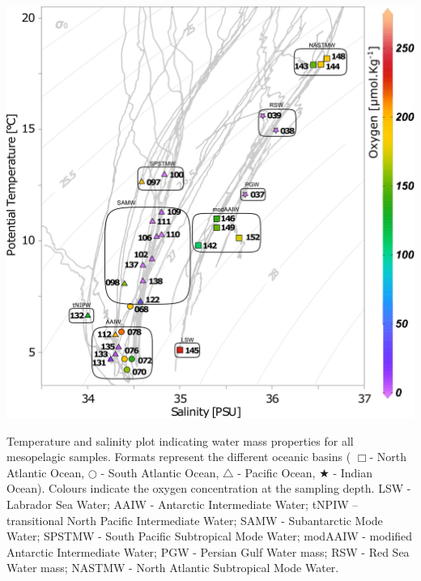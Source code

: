 \documentclass[fleqn,10pt]{wlscirep}
\begin{document}
\clearpage
\begin{suppfigure}[ht]
    \centering
    \includegraphics[scale=0.2]{images/T_Splot.pdf}
    \caption{Temperature and salinity plot indicating water mass properties for all mesopelagic samples. Formats represent the different oceanic basins ( $\Box$- North Atlantic Ocean, $\bigcirc$  - South Atlantic Ocean, $\bigtriangleup$ - Pacific Ocean, $\bigstar$ - Indian Ocean). Colours indicate the oxygen concentration at the sampling depth. LSW - Labrador Sea Water; AAIW - Antarctic Intermediate Water; tNPIW – transitional North Pacific Intermediate Water; SAMW - Subantarctic Mode Water; SPSTMW - South Pacific Subtropical Mode Water; modAAIW - modified Antarctic Intermediate Water; PGW - Persian Gulf Water mass; RSW - Red Sea Water mass; NASTMW - North Atlantic Subtropical Mode Water.}
    \label{fig:T_Splot}
\end{suppfigure}
\clearpage
\end{document}
